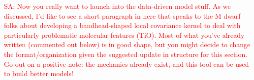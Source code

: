 \documentclass[iop,floatfix]{emulateapj}
\newcommand{\comm}[1]{ \textcolor{red}{SA: #1}}
\begin{document}
\comm{Now you really want to launch into the data-driven model stuff.  As we discussed, I'd like to 
see a short paragraph in here that speaks to the M dwarf folks about developing a bandhead-shaped 
local covariance kernel to deal with particularly problematic molecular features (TiO).  Most of 
what you've already written (commented out below) is in good shape, but you might decide to change 
the format/organization given the suggested update in structure for this section.  Go out on a 
positive note: the mechanics already exist, and this tool can be used to build better models!}


\end{document}
